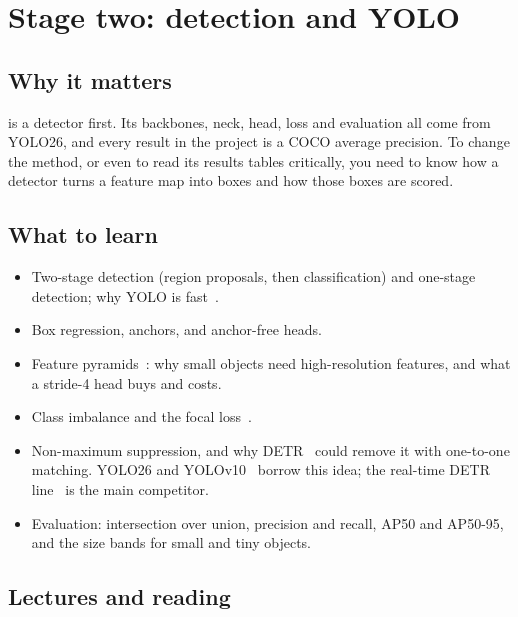 \chapter{Stage two: detection and YOLO}

\section{Why it matters}

\method{} is a detector first. Its backbones, neck, head, loss and evaluation all come from YOLO26, and every
result in the project is a COCO average precision. To change the method, or even to read its results tables
critically, you need to know how a detector turns a feature map into boxes and how those boxes are scored.

\section{What to learn}

\begin{itemize}
  \item Two-stage detection (region proposals, then classification) and one-stage detection; why YOLO is fast~\cite{ren2015fasterrcnn,redmon2016yolo}.
  \item Box regression, anchors, and anchor-free heads.
  \item Feature pyramids~\cite{lin2017fpn}: why small objects need high-resolution features, and what a stride-4 head buys and costs.
  \item Class imbalance and the focal loss~\cite{lin2017focal}.
  \item Non-maximum suppression, and why DETR~\cite{carion2020detr} could remove it with one-to-one matching.
        YOLO26 and YOLOv10~\cite{wang2024yolov10} borrow this idea; the real-time DETR line~\cite{zhao2024rtdetr} is the main competitor.
  \item Evaluation: intersection over union, precision and recall, AP50 and AP50-95, and the size bands for small and tiny objects.
\end{itemize}

\section{Lectures and reading}

